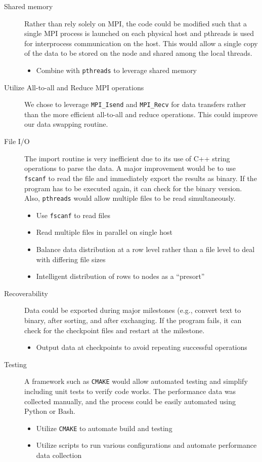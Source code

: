 \documentclass{article}
\begin{document}
\begin{description}
    \item [Shared memory]{Rather than rely solely on MPI, the code could be modified such that a single MPI process is launched on each physical host and pthreads is used for interprocess communication on the host. This would allow a single copy of the data to be stored on the node and shared among the local threads.}
        \begin{itemize}
            \item Combine with \texttt{pthreads} to leverage shared memory
        \end{itemize}
    \item [Utilize All-to-all and Reduce MPI operations]{We chose to leverage \texttt{MPI\_Isend} and \texttt{MPI\_Recv} for data transfers rather than the more efficient all-to-all and reduce operations. This could improve our data swapping routine.}
    \item [File I/O]{The import routine is very inefficient due to its use of C++ string operations to parse the data. A major improvement would be to use \texttt{fscanf} to read the file and immediately export the results as binary. If the program has to be executed again, it can check for the binary version. Also, \texttt{pthreads} would allow multiple files to be read simultaneously.}
        \begin{itemize}
            \item Use \texttt{fscanf} to read files
            \item Read multiple files in parallel on single host
            \item Balance data distribution at a row level rather than a file level to deal with differing file sizes
            \item Intelligent distribution of rows to nodes as a ``presort''
        \end{itemize}
    \item [Recoverability]{Data could be exported during major milestones (e.g., convert text to binary, after sorting, and after exchanging. If the program fails, it can check for the checkpoint files and restart at the milestone.}
        \begin{itemize}
            \item Output data at checkpoints to avoid repeating successful operations
        \end{itemize}
     \item [Testing]{A framework such as \texttt{CMAKE} would allow automated testing and simplify including unit tests to verify code works. The performance data was collected manually, and the process could be easily automated using Python or Bash.}
     	\begin{itemize}
	\item Utilize \texttt{CMAKE} to automate build and testing
	\item Utilize scripts to run various configurations and automate performance data collection
	\end{itemize}
\end{description}


\end{document}
